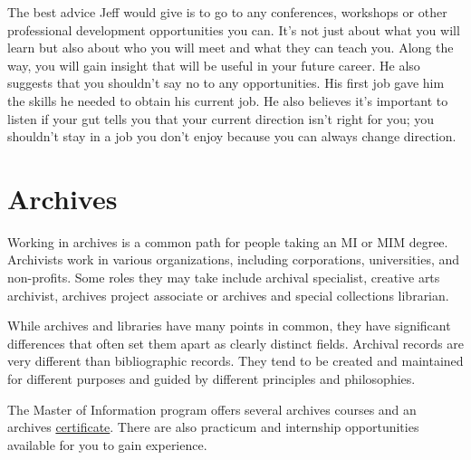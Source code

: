 \documentclass[
  letterpaper,
  DIV=11,
  numbers=noendperiod]{scrreprt}
\begin{document}
\begin{tcolorbox}
The best advice Jeff would give is to go to any conferences, workshops
or other professional development opportunities you can. It's not just
about what you will learn but also about who you will meet and what they
can teach you. Along the way, you will gain insight that will be useful
in your future career. He also suggests that you shouldn't say no to any
opportunities. His first job gave him the skills he needed to obtain his
current job. He also believes it's important to listen if your gut tells
you that your current direction isn't right for you; you shouldn't stay
in a job you don't enjoy because you can always change direction.

\end{tcolorbox}

\section{Archives}\label{archives}

Working in archives is a common path for people taking an MI or MIM
degree. Archivists work in various organizations, including
corporations, universities, and non-profits. Some roles they may take
include archival specialist, creative arts archivist, archives project
associate or archives and special collections librarian.

While archives and libraries have many points in common, they have
significant differences that often set them apart as clearly distinct
fields. Archival records are very different than bibliographic records.
They tend to be created and maintained for different purposes and guided
by different principles and philosophies.

\begin{tcolorbox}[enhanced jigsaw, arc=.35mm, bottomrule=.15mm, bottomtitle=1mm, breakable, colback=white, colbacktitle=quarto-callout-note-color!10!white, colframe=quarto-callout-note-color-frame, coltitle=black, left=2mm, leftrule=.75mm, opacityback=0, opacitybacktitle=0.6, rightrule=.15mm, title=\textcolor{quarto-callout-note-color}{\faInfo}\hspace{0.5em}{Did you know?}, titlerule=0mm, toprule=.15mm, toptitle=1mm]

The Master of Information program offers several archives courses and an
archives
\href{https://www.dal.ca/faculty/management/school-of-information-management/current-students-site/certificates.html}{certificate}.
There are also practicum and internship opportunities available for you
to gain experience.

\end{tcolorbox}
\end{document}
